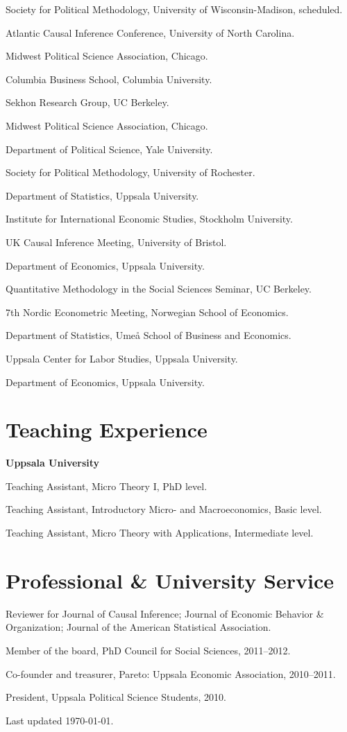 \documentclass[10pt,letterpaper]{article}
\newenvironment{datelist}{
	\begin{list}{}{
		\setlength{\parskip}{0pt}
		\setlength{\itemsep}{4pt}
		\setlength{\parsep}{0.3em}
		\setlength{\leftmargin}{6em}
		\setlength{\labelwidth}{6em}
		\setlength{\labelsep}{1.5em}
		}
	}{
\end{list}
}
\newenvironment{singledatelist}{
	\begin{list}{}{
		\setlength{\parskip}{0pt}
		\setlength{\itemsep}{4pt}
		\setlength{\parsep}{0.3em}
		\setlength{\leftmargin}{5em}
		\setlength{\labelwidth}{6em}
		\setlength{\labelsep}{1.5em}
		}
	}{
\end{list}
}
\newcommand{\dateitem}[2][]{\item[{#1}] {#2}}
\newcommand{\dateheader}[1]{\item{\hspace{-4.6em}\textbf{ {#1} }}}
\newenvironment{infolist}{
	\begin{list}{}{
		\setlength{\parskip}{0pt}
		\setlength{\itemsep}{4pt}
		\setlength{\parsep}{0.3em}
		\setlength{\leftmargin}{1.6em}
		\setlength{\labelwidth}{0pt}
		}
	}{
\end{list}
}
\newcommand{\infoitem}[1]{\item {#1}}
\begin{document}
	\begin{singledatelist}
		\dateitem[2017]{Society for Political Methodology, University of Wisconsin-Madison, scheduled.}
		\dateitem{Atlantic Causal Inference Conference, University of North Carolina.}
		\dateitem{Midwest Political Science Association, Chicago.}
		\dateitem[2016]{Columbia Business School, Columbia University.}
		\dateitem{Sekhon Research Group, UC Berkeley.}
		\dateitem{Midwest Political Science Association, Chicago.}
		\dateitem[2015]{Department of Political Science, Yale University.}
		\dateitem{Society for Political Methodology, University of Rochester.}
		\dateitem{Department of Statistics, Uppsala University.}
		\dateitem{Institute for International Economic Studies, Stockholm University.}
		\dateitem{UK Causal Inference Meeting, University of Bristol.}
		\dateitem[2014]{Department of Economics, Uppsala University.}
		\dateitem{Quantitative Methodology in the Social Sciences Seminar, UC Berkeley.}
		\dateitem[2013]{7th Nordic Econometric Meeting, Norwegian School of Economics.}
		\dateitem{Department of Statistics, Umeå School of Business and Economics.}
		\dateitem{Uppsala Center for Labor Studies, Uppsala University.}
		\dateitem[2012]{Department of Economics, Uppsala University.}
	\end{singledatelist}


	\section*{Teaching Experience}

	\begin{datelist}
		\dateheader{Uppsala University}
		\dateitem[2011--2012]{Teaching Assistant, Micro Theory I, PhD level.}
		\dateitem[2011--2012]{Teaching Assistant, Introductory Micro- and Macroeconomics, Basic level.}
		\dateitem[2011]{Teaching Assistant, Micro Theory with Applications, Intermediate level.}
	\end{datelist}


	\section*{Professional \& University Service}

	\begin{infolist}
		\infoitem{Reviewer for Journal of Causal Inference; Journal of Economic Behavior \& Organization; Journal of the American Statistical Association.}
		\infoitem{Member of the board, PhD Council for Social Sciences, 2011--2012.}
		\infoitem{Co-founder and treasurer, Pareto: Uppsala Economic Association, 2010--2011.}
		\infoitem{President, Uppsala Political Science Students, 2010.}
	\end{infolist}


	\bigskip
	{\small Last updated \today.}
\end{document}

